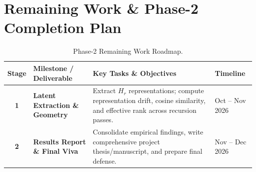 \documentclass[11pt,a4paper]{article}
\begin{document}
\section{Remaining Work \& Phase-2 Completion Plan}
\begin{table}[h!]
\centering
\small
\caption{Phase-2 Remaining Work Roadmap.}
\label{tab:roadmap}
\vspace{2pt}
\begin{tabularx}{\linewidth}{clXl}
\toprule
\textbf{Stage} & \textbf{Milestone / Deliverable} & \textbf{Key Tasks \& Objectives} & \textbf{Timeline} \\
\midrule
\textbf{1} & \textbf{Latent Extraction \& Geometry} & Extract $H_r$ representations; compute representation drift, cosine similarity, and effective rank across recursion passes. & Oct -- Nov 2026 \\
\textbf{2} & \textbf{Results Report \& Final Viva} & Consolidate empirical findings, write comprehensive project thesis/manuscript, and prepare final defense. & Nov -- Dec 2026 \\
\bottomrule
\end{tabularx}
\end{table}
\end{document}
